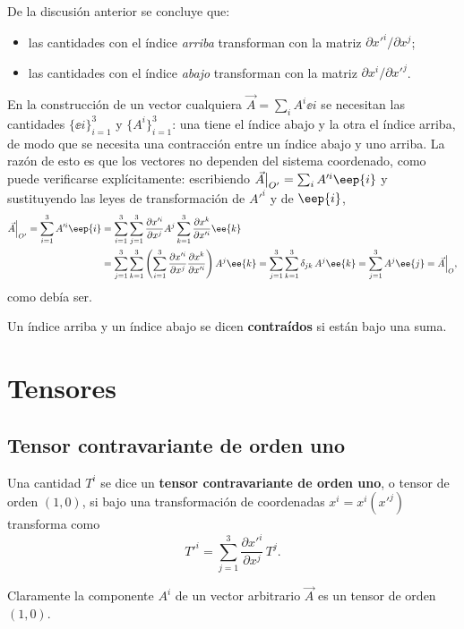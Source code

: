 De la discusión anterior se concluye que:
\begin{itemize}
\item las cantidades con el índice \emph{arriba} transforman con la matriz $\partial x'^i/\partial x^j$;
\item las cantidades con el índice \emph{abajo} transforman con la matriz $\partial x^i/\partial x'^j$.
\end{itemize}
En la construcción de un vector cualquiera $\vec A = \sum_i A^i\ee{i}$ se necesitan las cantidades $\{\ee{i}\}_{i=1}^3$ y $\{A^i\}_{i=1}^3$: una tiene el índice abajo y la otra el índice arriba, de modo que se necesita una contracción entre un índice abajo y uno arriba. La razón de esto es que los vectores no dependen del sistema coordenado, como puede verificarse explícitamente: escribiendo $\vec A\big|_{O'} = \sum_i A'^i \eep{i}$ y sustituyendo las leyes de transformación de $A'^i$ y de $\eep{i}$,
\begin{align}
\vec A\Big|_{O'} = \sum_{i=1}^3 A'^i\eep{i}
&= \sum_{i=1}^3\sum_{j=1}^3\frac{\partial x'^i}{\partial x^j}A^j \sum_{k=1}^3\frac{\partial x^k}{\partial x'^i}\ee{k} \notag \\
&= \sum_{j=1}^3\sum_{k=1}^3\left(\sum_{i=1}^3\frac{\partial x'^i}{\partial x^j}\frac{\partial x^k}{\partial x'^i}\right)A^j\ee{k}
= \sum_{j=1}^3\sum_{k=1}^3 \delta_{jk}\,A^j\ee{k} = \sum_{j=1}^3 A^j\ee{j} = \vec A\Big|_{O} ,
\end{align}
como debía ser.

\begin{definicion}
Un índice arriba y un índice abajo se dicen \textbf{contraídos} si están bajo una suma.
\end{definicion}

\section{Tensores}

\subsection{Tensor contravariante de orden uno}

\begin{definicion}
Una cantidad $T^i$ se dice un \textbf{tensor contravariante de orden uno}, o tensor de orden $(1,0)$, si bajo una transformación de coordenadas $x^i=x^i(x'^j)$ transforma como
\begin{equation}
T'^i = \sum_{j=1}^3 \frac{\partial x'^i}{\partial x^j}\, T^j .
\end{equation}
\end{definicion}
Claramente la componente $A^i$ de un vector arbitrario $\vec A$ es un tensor de orden $(1,0)$.

